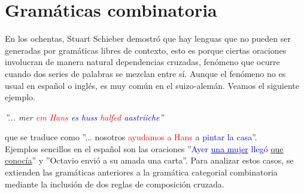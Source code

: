 \documentclass[../main.tex]{subfiles}
\begin{document}
	\section{Gramáticas combinatoria}
	
	En los ochentas, Stuart Schieber demostró que hay lenguas que no pueden ser generadas por gramáticas libres de contexto, esto es porque ciertas oraciones involucran de manera natural dependencias cruzadas, fenómeno que ocurre cuando dos series de palabras se mezclan entre sí. Aunque el fenómeno no es usual en español o inglés, es muy común en el suizo-alemán. Veamos el siguiente ejemplo.
    \begin{center}
        \textit{''... mer \textcolor{red}{em Hans} \textcolor{blue}{es huss} \textcolor{red}{halfed} \textcolor{blue}{aastriiche}''} \\   
    \end{center}
	que se traduce como ''... nosotros \textcolor{red}{ayudamos a Hans} a \textcolor{blue}{pintar la casa}''.\\
	Ejemplos sencillos en el español son las oraciones ''\textcolor{blue}{Ayer}  \textcolor{blue}{\ul{una mujer} llegó} \ul{que conocía}'' y ''Octavio envió a su amada una carta''.
	Para analizar estos casos, se extienden las gramáticas anteriores a la gramática categorial combinatoria mediante la inclusión de dos reglas de composición cruzada.
	
\end{document}
